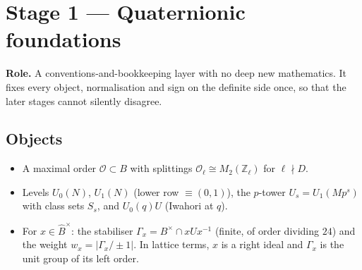 \documentclass[11pt,a4paper]{article}
\newcommand{\Z}{\mathbb{Z}}
\newcommand{\cO}{\mathcal{O}}
\newcommand{\Bhat}{\widehat{B}}
\newcommand{\role}[1]{\textbf{Role.} #1}
\begin{document}
\section{Stage 1 --- Quaternionic foundations}

\role{A conventions-and-bookkeeping layer with no deep new mathematics. It fixes every object, normalisation and sign on
the definite side once, so that the later stages cannot silently disagree.}

\subsection*{Objects}
\begin{itemize}
  \item A maximal order $\cO\subset B$ with splittings $\cO_\ell\cong M_2(\Z_\ell)$ for $\ell\nmid D$.
  \item Levels $U_0(N)$, $U_1(N)$ (lower row $\equiv(0,1)$), the $p$-tower $U_s=U_1(Mp^s)$ with class sets $S_s$, and
        $U_0(q)U$ (Iwahori at $q$).
  \item For $x\in\Bhat^\times$: the stabiliser $\Gamma_x=B^\times\cap xUx^{-1}$ (finite, of order dividing $24$) and
        the weight $w_x=|\Gamma_x/\pm1|$. In lattice terms, $x$ is a right ideal and $\Gamma_x$ is the unit group of its
        left order.
\end{itemize}
\end{document}
